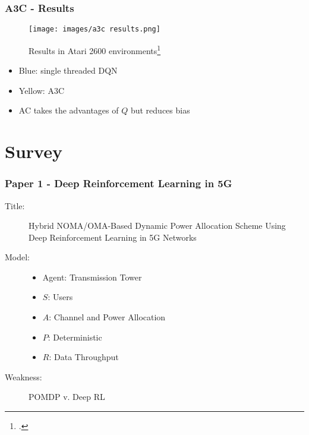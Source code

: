\documentclass{beamer}
\begin{document}
\begin{frame}
    \frametitle{A3C - Results}
    \begin{figure}
        \texttt{[image: images/a3c results.png]}
        \caption{Results in Atari 2600 environments\footcite{mnih2016}}
    \end{figure}
    \begin{itemize}
        \item Blue: single threaded DQN
        \item Yellow: A3C
        \item AC takes the advantages of $Q$ but reduces bias
    \end{itemize}
\end{frame}

\section{Survey}

\begin{frame}
    \frametitle{Paper 1 - Deep Reinforcement Learning in 5G}
    \begin{description}
        \item[Title:] Hybrid NOMA/OMA-Based Dynamic Power Allocation Scheme Using 
        Deep Reinforcement Learning in 5G Networks
        \item[Model:]
        \begin{itemize}
            \item Agent: Transmission Tower
            \item $S$: Users
            \item $A$: Channel and Power Allocation
            \item $P$: Deterministic
            \item $R$: Data Throughput
        \end{itemize}
        \item[Weakness:] POMDP v. Deep RL 
    \end{description}
\end{frame}
\end{document}
